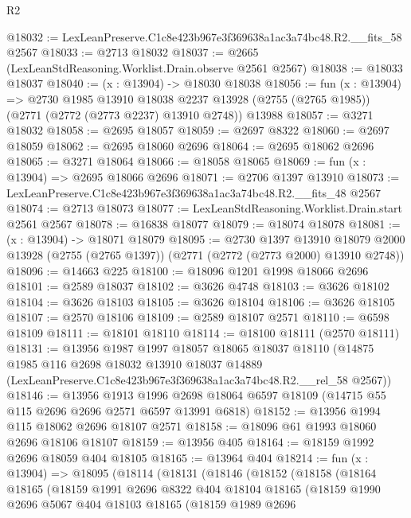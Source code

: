 \begin{lexlean}{R2}
\begin{coremodule}
@18032 := LexLeanPreserve.C1c8e423b967e3f369638a1ac3a74bc48.R2.__fits_58 @2567
@18033 := @2713 @18032
@18037 := @2665 (LexLeanStdReasoning.Worklist.Drain.observe @2561 @2567)
@18038 := @18033 @18037
@18040 := (x : @13904) -> @18030 @18038
@18056 := fun (x : @13904) =>
  @2730
    @1985
    @13910
    @18038
    @2237
    @13928
    (@2755 (@2765 @1985))
    (@2771 (@2772 (@2773 @2237) @13910 @2748))
    @13988
@18057 := @3271 @18032
@18058 := @2695 @18057
@18059 := @2697 @8322
@18060 := @2697 @18059
@18062 := @2695 @18060 @2696
@18064 := @2695 @18062 @2696
@18065 := @3271 @18064
@18066 := @18058 @18065
@18069 := fun (x : @13904) => @2695 @18066 @2696
@18071 := @2706 @1397 @13910
@18073 := LexLeanPreserve.C1c8e423b967e3f369638a1ac3a74bc48.R2.__fits_48 @2567
@18074 := @2713 @18073
@18077 := LexLeanStdReasoning.Worklist.Drain.start @2561 @2567
@18078 := @16838 @18077
@18079 := @18074 @18078
@18081 := (x : @13904) -> @18071 @18079
@18095 := @2730
    @1397
    @13910
    @18079
    @2000
    @13928
    (@2755 (@2765 @1397))
    (@2771 (@2772 (@2773 @2000) @13910 @2748))
@18096 := @14663 @225
@18100 := @18096 @1201 @1998 @18066 @2696
@18101 := @2589 @18037
@18102 := @3626 @4748
@18103 := @3626 @18102
@18104 := @3626 @18103
@18105 := @3626 @18104
@18106 := @3626 @18105
@18107 := @2570 @18106
@18109 := @2589 @18107 @2571
@18110 := @6598 @18109
@18111 := @18101 @18110
@18114 := @18100 @18111 (@2570 @18111)
@18131 := @13956
    @1987
    @1997
    @18057
    @18065
    @18037
    @18110
    (@14875
      @1985
      @116
      @2698
      @18032
      @13910
      @18037
      @14889
      (LexLeanPreserve.C1c8e423b967e3f369638a1ac3a74bc48.R2.__rel_58 @2567))
@18146 := @13956
    @1913
    @1996
    @2698
    @18064
    @6597
    @18109
    (@14715 @55 @115 @2696 @2696 @2571 @6597 @13991 @6818)
@18152 := @13956 @1994 @115 @18062 @2696 @18107 @2571
@18158 := @18096 @61 @1993 @18060 @2696 @18106 @18107
@18159 := @13956 @405
@18164 := @18159 @1992 @2696 @18059 @404 @18105
@18165 := @13964 @404
@18214 := fun (x : @13904) =>
  @18095
    (@18114
      (@18131
        (@18146
          (@18152
            (@18158
              (@18164
                @18165
                (@18159
                  @1991
                  @2696
                  @8322
                  @404
                  @18104
                  @18165
                  (@18159
                    @1990
                    @2696
                    @5067
                    @404
                    @18103
                    @18165
                    (@18159
                      @1989
                      @2696

\end{coremodule}
\end{lexlean}
